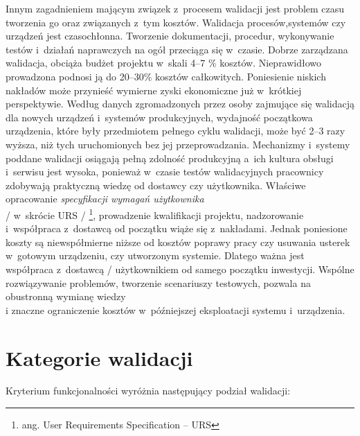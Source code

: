 \documentclass{xmgr}
\begin{document}
\indent Innym zagadnieniem mającym związek z~procesem walidacji jest problem czasu tworzenia go oraz związanych z~tym kosztów. Walidacja procesów,systemów czy urządzeń jest czasochłonna. Tworzenie dokumentacji, procedur, wykonywanie testów i~działań naprawczych na ogół przeciąga się w~czasie. Dobrze zarządzana walidacja, obciąża budżet projektu w~skali 4--7 \% kosztów. Nieprawidłowo prowadzona podnosi ją do 20--30\% kosztów całkowitych. Poniesienie niskich nakładów może przynieść wymierne zyski ekonomiczne już w~krótkiej perspektywie. Według danych zgromadzonych przez osoby zajmujące się walidacją dla nowych urządzeń i~systemów produkcyjnych, wydajność początkowa urządzenia, które były przedmiotem pełnego cyklu walidacji, może być 2--3 razy wyższa, niż tych uruchomionych bez jej przeprowadzania. Mechanizmy i~systemy poddane walidacji osiągają pełną zdolność produkcyjną a~ich kultura obsługi i~serwisu jest wysoka, ponieważ w~czasie testów walidacyjnych pracownicy zdobywają praktyczną wiedzę od dostawcy czy użytkownika. Właściwe opracowanie \textit{specyfikacji wymagań użytkownika}
\\
/ w~skrócie URS / \footnote{ang. User Requirements Specification -- URS}, prowadzenie kwalifikacji projektu, nadzorowanie i~współpraca z~dostawcą od początku wiąże się z~nakładami. Jednak poniesione koszty są niewspółmierne niższe od kosztów poprawy pracy czy usuwania usterek w~gotowym urządzeniu, czy utworzonym systemie. Dlatego ważna jest współpraca z~dostawcą / użytkownikiem  od samego początku inwestycji. Wspólne rozwiązywanie problemów, tworzenie scenariuszy testowych, pozwala na obustronną wymianę wiedzy
\\
i znaczne ograniczenie kosztów w~późniejszej eksploatacji systemu i~urządzenia.\cite{ekonomia}

\section{Kategorie walidacji}

Kryterium funkcjonalności wyróżnia następujący podział walidacji:
\end{document}
